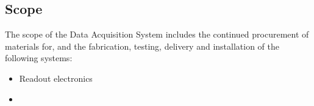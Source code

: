 

\subsection{Scope}
\label{sec:fdsp-daq-scope}

The scope of the Data Acquisition System includes the continued procurement of materials for, and the fabrication, testing, delivery and installation of the following systems: 


\begin{itemize}
\item Readout electronics 
\item 
\end{itemize}


\newpage 
